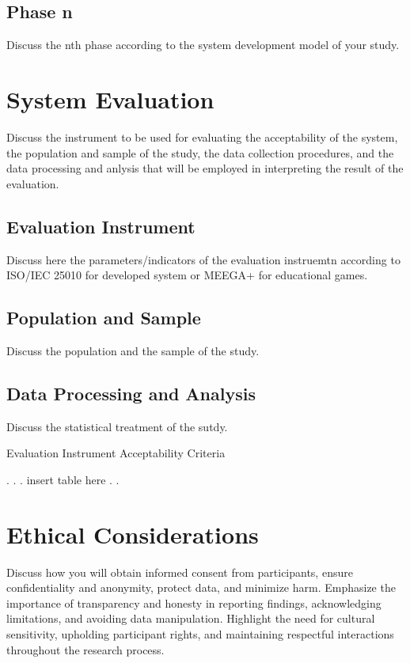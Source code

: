 \subsection{Phase n}
Discuss the nth phase according to the system development model of your study.

\section{System Evaluation}

Discuss the instrument to be used for evaluating the acceptability of the system, the population and sample of the study, the data collection procedures, and the data processing and anlysis that will be employed in interpreting the result of the evaluation.

\subsection{Evaluation Instrument}
Discuss here the parameters/indicators of the evaluation instruemtn according to ISO/IEC 25010 for developed system or MEEGA+ for educational games.

\subsection{Population and Sample}
Discuss the population and the sample of the study.

\subsection{Data Processing and Analysis}
Discuss the statistical treatment of the sutdy.

\begin{table}[h]
	\centering
	\caption{Evaluation Instrument Acceptability Criteria}
	\label{tab:evaluation-instrument}
	. . . insert table here . . 
\end{table}

\section{Ethical Considerations}
Discuss how you will obtain informed consent from participants, ensure confidentiality and anonymity, protect data, and minimize harm. Emphasize the importance of transparency and honesty in reporting findings, acknowledging limitations, and avoiding data manipulation. Highlight the need for cultural sensitivity, upholding participant rights, and maintaining respectful interactions throughout the research process.